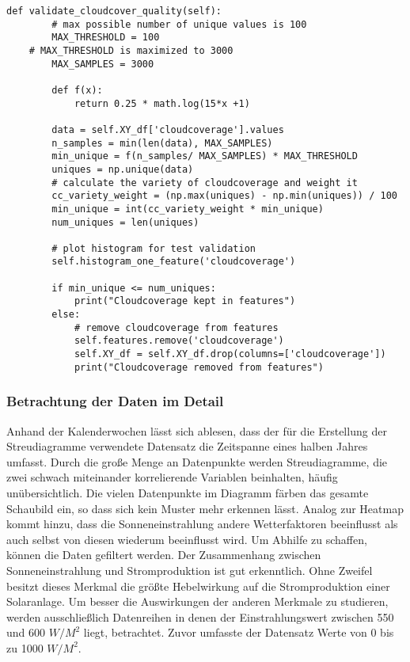 \documentclass[12pt, a4paper]{article}
\begin{document}
\begin{lstlisting}[basicstyle=\small,label={lst:validate_cloudcover}, caption={Funktion zur Validierung der Bewölkungsdaten}]
def validate_cloudcover_quality(self):
        # max possible number of unique values is 100
        MAX_THRESHOLD = 100
	# MAX_THRESHOLD is maximized to 3000
        MAX_SAMPLES = 3000       
        
        def f(x):            
            return 0.25 * math.log(15*x +1)
        
        data = self.XY_df['cloudcoverage'].values        
        n_samples = min(len(data), MAX_SAMPLES)
        min_unique = f(n_samples/ MAX_SAMPLES) * MAX_THRESHOLD
        uniques = np.unique(data)
        # calculate the variety of cloudcoverage and weight it
        cc_variety_weight = (np.max(uniques) - np.min(uniques)) / 100
        min_unique = int(cc_variety_weight * min_unique)
        num_uniques = len(uniques)
        
        # plot histogram for test validation
        self.histogram_one_feature('cloudcoverage')
                
        if min_unique <= num_uniques:
            print("Cloudcoverage kept in features")
        else:
            # remove cloudcoverage from features
            self.features.remove('cloudcoverage')
            self.XY_df = self.XY_df.drop(columns=['cloudcoverage'])
            print("Cloudcoverage removed from features")
\end{lstlisting}



\subsubsection{Betrachtung der Daten im Detail}

Anhand der Kalenderwochen lässt sich ablesen, dass der für die Erstellung der Streudiagramme verwendete Datensatz die Zeitspanne eines halben Jahres umfasst. Durch die große Menge an Datenpunkte werden Streudiagramme, die zwei schwach miteinander korrelierende Variablen beinhalten, häufig unübersichtlich. Die vielen Datenpunkte im Diagramm färben das gesamte Schaubild ein, so dass sich kein Muster mehr erkennen lässt. Analog zur Heatmap kommt hinzu, dass die Sonneneinstrahlung andere Wetterfaktoren beeinflusst als auch selbst von diesen wiederum beeinflusst wird. Um Abhilfe zu schaffen, können die Daten gefiltert werden. Der Zusammenhang zwischen Sonneneinstrahlung und Stromproduktion ist gut erkenntlich. Ohne Zweifel besitzt dieses Merkmal die größte Hebelwirkung auf die Stromproduktion einer Solaranlage. Um besser die Auswirkungen der anderen Merkmale zu studieren, werden ausschließlich Datenreihen in denen der Einstrahlungswert zwischen 550 und 600 $W/ M^2$ liegt, betrachtet. Zuvor umfasste der Datensatz Werte von 0 bis zu 1000 $W/ M^2$.
\end{document}
